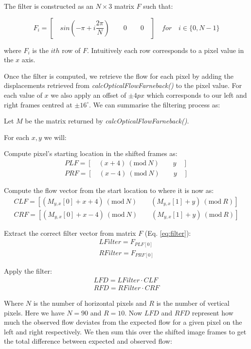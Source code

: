 \documentclass[a4paper,11pt,twoside,openright]{article}
\newcommand{\Mod}[1]{\ (\mathrm{mod}\ #1)}
\begin{document}
The filter is constructed as an $N \times 3$ matrix $F$ such that:

\begin{equation}
  \label{eq:filter}
F_i = [ \quad sin(-\pi + i\frac{2\pi}{N}) \qquad 0 \qquad 0 \quad ] \quad \textit{for} \quad i \in \{0, N - 1\}
\end{equation}

where $F_i$ is the $ith$ row of $F$. Intuitively each row corresponds to a pixel value in the $x$ axis.
\newline


Once the filter is computed, we retrieve the flow for each pixel by adding the displacements
retrieved from \textit{calcOpticalFlowFarneback()} to the pixel value. 
For each value of $x$ we also apply an offset of $\pm 4px$ which corresponds to our left and right frames centred at
$\pm 16^{\circ}$. We can summarise the filtering process as:
\newline

Let $M$ be the matrix returned by \textit{calcOpticalFlowFarneback()}.

For each $x, y$ we will:
\newline

\centering
Compute pixel's starting location in the shifted frames as:
\begin{align*}
  PLF = [ \quad (x + 4)\Mod{N} \qquad y \quad ]\\
  PRF = [ \quad (x - 4)\Mod{N} \qquad y \quad ]
\end{align*}

Compute the flow vector from the start location to where it is now as:
\begin{align*}
  CLF = [ (M_{y,x}[0] + x + 4)\Mod{N} \qquad (M_{y,x}[1] + y) \Mod{R} ]\\
  CRF = [ (M_{y,x}[0] + x - 4)\Mod{N} \qquad (M_{y,x}[1] + y) \Mod{R} ]
\end{align*}

Extract the correct filter vector from matrix $F$ (Eq. \ref{eq:filter}):
\begin{align*}
  LFilter = F_{PLF[0]}\\
  RFilter = F_{PRF[0]}
\end{align*}

Apply the filter:
\begin{align}
  LFD = LFilter \cdot CLF \\
  RFD = RFilter \cdot CRF
\end{align}

\raggedright
Where $N$ is the number of horizontal pixels and $R$ is the number of vertical pixels. Here
we have $N = 90$ and $R = 10$. Now $LFD$ and $RFD$ represent how much
the observed flow deviates from the expected flow for a given pixel on the left and right respectively.
We then sum this over the shifted image frames to get the total difference between expected and observed flow:
\end{document}
